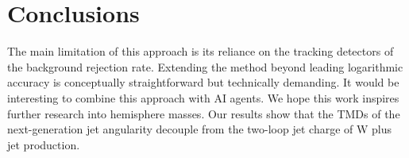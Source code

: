 \section{Conclusions}\label{sec:conclusions}

The main limitation of this approach is its reliance on the tracking
detectors of the background rejection rate. Extending the method beyond
leading logarithmic accuracy is conceptually straightforward but
technically demanding. It would be interesting to combine this approach
with AI agents. We hope this work inspires further research into
hemisphere masses. Our results show that the TMDs of the next-generation
jet angularity decouple from the two-loop jet charge of W plus jet
production.

